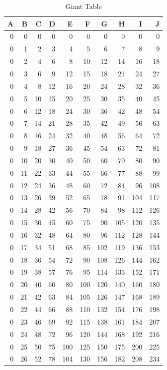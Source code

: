 \documentclass[11pt]{article}
\begin{document}
\begin{table}[htbp]
\caption{Giant Table}
\centering
\begin{tabular}{rrrrrrrrrr}
A & B & C & D & E & F & G & H & I & J\\
\hline
0 & 0 & 0 & 0 & 0 & 0 & 0 & 0 & 0 & 0\\
0 & 1 & 2 & 3 & 4 & 5 & 6 & 7 & 8 & 9\\
0 & 2 & 4 & 6 & 8 & 10 & 12 & 14 & 16 & 18\\
0 & 3 & 6 & 9 & 12 & 15 & 18 & 21 & 24 & 27\\
0 & 4 & 8 & 12 & 16 & 20 & 24 & 28 & 32 & 36\\
0 & 5 & 10 & 15 & 20 & 25 & 30 & 35 & 40 & 45\\
0 & 6 & 12 & 18 & 24 & 30 & 36 & 42 & 48 & 54\\
0 & 7 & 14 & 21 & 28 & 35 & 42 & 49 & 56 & 63\\
0 & 8 & 16 & 24 & 32 & 40 & 48 & 56 & 64 & 72\\
0 & 9 & 18 & 27 & 36 & 45 & 54 & 63 & 72 & 81\\
0 & 10 & 20 & 30 & 40 & 50 & 60 & 70 & 80 & 90\\
0 & 11 & 22 & 33 & 44 & 55 & 66 & 77 & 88 & 99\\
0 & 12 & 24 & 36 & 48 & 60 & 72 & 84 & 96 & 108\\
0 & 13 & 26 & 39 & 52 & 65 & 78 & 91 & 104 & 117\\
0 & 14 & 28 & 42 & 56 & 70 & 84 & 98 & 112 & 126\\
0 & 15 & 30 & 45 & 60 & 75 & 90 & 105 & 120 & 135\\
0 & 16 & 32 & 48 & 64 & 80 & 96 & 112 & 128 & 144\\
0 & 17 & 34 & 51 & 68 & 85 & 102 & 119 & 136 & 153\\
0 & 18 & 36 & 54 & 72 & 90 & 108 & 126 & 144 & 162\\
0 & 19 & 38 & 57 & 76 & 95 & 114 & 133 & 152 & 171\\
0 & 20 & 40 & 60 & 80 & 100 & 120 & 140 & 160 & 180\\
0 & 21 & 42 & 63 & 84 & 105 & 126 & 147 & 168 & 189\\
0 & 22 & 44 & 66 & 88 & 110 & 132 & 154 & 176 & 198\\
0 & 23 & 46 & 69 & 92 & 115 & 138 & 161 & 184 & 207\\
0 & 24 & 48 & 72 & 96 & 120 & 144 & 168 & 192 & 216\\
0 & 25 & 50 & 75 & 100 & 125 & 150 & 175 & 200 & 225\\
0 & 26 & 52 & 78 & 104 & 130 & 156 & 182 & 208 & 234\\

\end{tabular}
\end{table}
\end{document}
